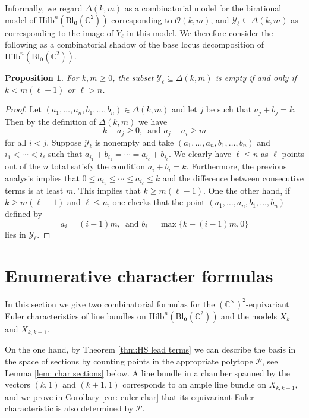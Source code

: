 \documentclass[12pt]{amsart}
\newcommand{\Hilb}{\mathrm{Hilb}}
\newcommand{\C}{\mathbb{C}}
\newcommand{\CP}{\mathcal{P}}
\newcommand{\CO}{\mathcal{O}}
\newcommand{\Bl}{\mathrm{Bl}}
\numberwithin{equation}{section}
\newtheorem{proposition}[theorem]{Proposition}
\theoremstyle{definition}
\begin{document}
Informally, we regard $\Delta(k,m)$ as a combinatorial model for the birational model of $\Hilb^n(\Bl_{\mathbf{0}}(\C^2))$ corresponding to $\CO(k,m)$, and $\mathcal{Y}_\ell \subseteq \Delta(k,m)$ as corresponding to the image of $Y_\ell$ in this model. We therefore consider the following as a combinatorial shadow of the base locus decomposition of $\Hilb^n(\Bl_{\mathbf{0}}(\C^2))$.

\begin{proposition}\label{prop:base locus analogue for NO body}
    For $k,m\geq 0$, the subset $\mathcal{Y}_\ell\subseteq \Delta(k,m)$ is empty if and only if $k<m(\ell-1)$ or $\ell>n$.
\end{proposition}

\begin{proof}
    Let $(a_1,\dots,a_n,b_1,\dots,b_n)\in \Delta(k,m)$ and let $j$ be such that $a_j+b_j=k$. Then by the definition of $\Delta(k,m)$ we have 
    \[ k-a_j\geq 0,\, \text{ and } a_j-a_i \geq m \] 
    for all $i<j$. Suppose $\mathcal{Y}_\ell$ is nonempty and take $(a_1,\dots,a_n,b_1,\dots,b_n)$ and $i_1<\cdots<i_{\ell}$ such that $a_{i_1}+b_{i_1} = \cdots= a_{i_\ell}+b_{i_\ell}$. We clearly have $\ell\leq n$ as $\ell$ points out of the $n$ total satisfy the condition $a_i+b_i=k$. Furthermore, the previous analysis implies that $0\leq a_{i_1} \leq \cdots \leq a_{i_\ell}\leq k$ and the difference between consecutive terms is at least $m$. This implies that $k\geq m(\ell-1)$.
    One the other hand, if $k\geq m(\ell-1)$ and $\ell\leq n$, one checks that the point $\left( a_1,\dots,a_n,b_1,\dots,b_n\right)$ defined by 
    \[ a_i = (i-1)m, \, \text{ and } b_i = \max\{ k-(i-1)m,0 \} \]
    lies in $\mathcal{Y}_\ell$.
\end{proof}



\section{Enumerative character formulas}
\label{sec: character}

In this section we give two combinatorial formulas for the $(\C^{\times})^2$-equivariant Euler characteristics of line bundles on $\Hilb^n(\Bl_{\mathbf{0}}(\C^2))$ and the models $X_k$ and $X_{k,k+1}$. 

On the one hand, by Theorem \ref{thm:HS lead terms} we can describe the basis in the space of sections by counting points in the appropriate polytope $\CP$, see Lemma \ref{lem:  char sections} below. A line bundle in a chamber spanned by the vectors $(k,1)$ and $(k+1,1)$ corresponds to an ample line bundle  on $X_{k,k+1}$, and we prove in Corollary \ref{cor: euler char} that its equivariant Euler characteristic is also determined by $\CP$. 
\end{document}
